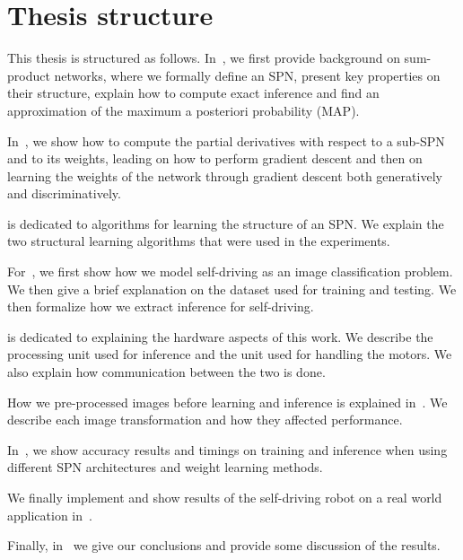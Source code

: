 \section{Thesis structure}

This thesis is structured as follows. In~, we first provide background on
sum-product networks, where we formally define an SPN, present key properties on their structure,
explain how to compute exact inference and find an approximation of the maximum a posteriori
probability (MAP).

In~, we show how to compute the partial derivatives with respect to a sub-SPN
and to its weights, leading on how to perform gradient descent and then on learning the weights of
the network through gradient descent both generatively and discriminatively.

 is dedicated to algorithms for learning the structure of an SPN\@. We explain
the two structural learning algorithms that were used in the experiments.

For~, we first show how we model self-driving as an image classification
problem. We then give a brief explanation on the dataset used for training and testing. We then
formalize how we extract inference for self-driving.

 is dedicated to explaining the hardware aspects of this work. We describe the
processing unit used for inference and the unit used for handling the motors. We also explain how
communication between the two is done.

How we pre-processed images before learning and inference is explained in~.
We describe each image transformation and how they affected performance.

In~, we show accuracy results and timings on training and inference when using
different SPN architectures and weight learning methods.

We finally implement and show results of the self-driving robot on a real world application
in~.

Finally, in~ we give our conclusions and provide some discussion of the
results.

